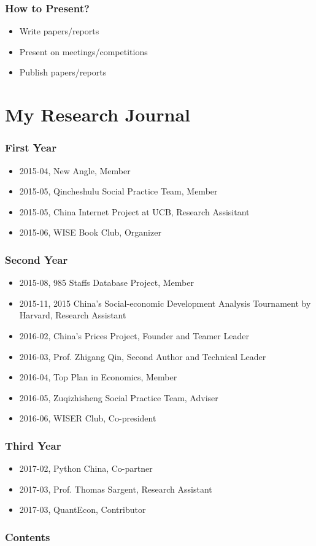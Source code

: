 \documentclass{beamer}
\begin{document}
\begin{frame}
\frametitle{How to Present?}
\begin{itemize}
	\item Write papers/reports
	\item Present on meetings/competitions
	\item Publish papers/reports
\end{itemize}
\end{frame}


\section{My Research Journal}

\begin{frame}
\frametitle{First Year}
\begin{itemize}
	\item 2015-04, New Angle, Member
	\item 2015-05, Qincheshulu Social Practice Team, Member
	\item 2015-05, China Internet Project at UCB, Research Assisitant
	\item 2015-06, WISE Book Club, Organizer
\end{itemize}
\end{frame}

\begin{frame}
\frametitle{Second Year}
\begin{itemize}
	\item 2015-08, 985 Staffs Database Project, Member
	\item 2015-11, 2015 China’s Social-economic Development Analysis Tournament by Harvard, Research Assistant
	\item 2016-02, China's Prices Project, Founder and Teamer Leader
	\item 2016-03, Prof. Zhigang Qin, Second Author and Technical Leader
	\item 2016-04, Top Plan in Economics, Member
	\item 2016-05, Zuqizhisheng Social Practice Team, Adviser 
	\item 2016-06, WISER Club, Co-president
\end{itemize}
\end{frame}

\begin{frame}
\frametitle{Third Year}
\begin{itemize}
	\item 2017-02, Python China, Co-partner
	\item 2017-03, Prof. Thomas Sargent, Research Assistant
	\item 2017-03, QuantEcon, Contributor 
\end{itemize}
\end{frame}


\begin{frame}[plain]
\frametitle{Contents}
\tableofcontents %
\end{frame}
\end{document}
